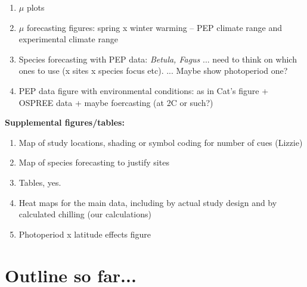\documentclass[11pt,letter]{article}
\begin{document}
\begin{enumerate}
\item $\mu$ plots
\item  $\mu$ forecasting figures: spring x winter warming -- PEP climate range and experimental climate range
\item Species forecasting with PEP data: \emph{Betula, Fagus} ... need to think on which ones to use (x sites x species focus etc). ... Maybe show photoperiod one?
\item PEP data figure with environmental conditions: as in Cat's figure + OSPREE data + maybe foercasting (at 2C or such?)
\end{enumerate}


{\bf Supplemental figures/tables:}
\begin{enumerate}
\item Map of study locations, shading or symbol coding for number of cues (Lizzie)
\item Map of species forecasting to justify sites
\item Tables, yes.
\item Heat maps for the main data, including by actual study design and by calculated chilling (our calculations)
\item Photoperiod x latitude effects figure
\end{enumerate}

\section{Outline so far...}
\end{document}
